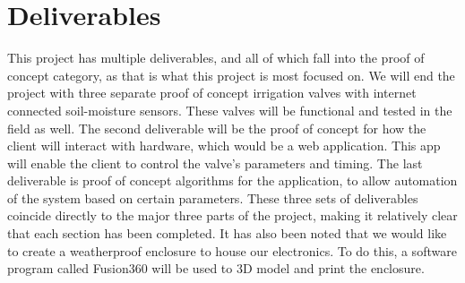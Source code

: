\documentclass[journal,10pt,onecolumn,draftclsnofoot,]{IEEEtran}
\begin{document}
\section{Deliverables}
This project has multiple deliverables, and all of which fall into the proof of concept category, as that is what this project is most focused on. We will end the project with three separate proof of concept irrigation valves with internet connected soil-moisture sensors. These valves will be functional and tested in the field as well. The second deliverable will be the proof of concept for how the client will interact with hardware, which would be a web application. This app will enable the client to control the valve’s parameters and timing. The last deliverable is proof of concept algorithms for the application, to allow automation of the system based on certain parameters. These three sets of deliverables coincide directly to the major three parts of the project, making it relatively clear that each section has been completed. It has also been noted that we would like to create a weatherproof enclosure to house our electronics. To do this, a software program called Fusion360 will be used to 3D model and print the enclosure. 
\newline
\end{document}
